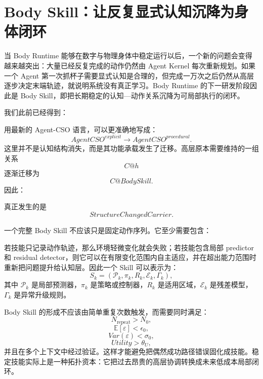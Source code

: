 \section{Body Skill：让反复显式认知沉降为身体闭环}

当 Body Runtime 能够在数字与物理身体中稳定运行以后，一个新的问题会变得越来越突出：大量已经反复完成的动作仍然由 Agent Kernel 每次重新规划。如果一个 Agent 第一次抓杯子需要显式认知是合理的，但完成一万次之后仍然从高层逐步决定末端轨迹，就说明系统没有真正学习。Body Runtime 的下一研发阶段因此是 Body Skill，即把长期稳定的认知—动作关系沉降为可局部执行的闭环。

我们此前已经得到：
\begin{statementbox}
\centering
{}
\end{statementbox}
用最新的 Agent-CSO 语言，可以更准确地写成：
\[
AgentCSO^{explicit}
\rightarrow
AgentCSO^{procedural}.
\]
这里并不是认知结构消失，而是其功能承载发生了迁移。高层原本需要维持的一组关系
\[
C@h
\]
逐渐迁移为
\[
C@BodySkill.
\]
因此：
\begin{statementbox}
\centering
{}
\end{statementbox}
真正发生的是
\[
StructureChangedCarrier.
\]

一个完整 Body Skill 不应该只是固定动作序列。它至少需要包含：
\begin{statementbox}
\centering
{}
\end{statementbox}
若技能只记录动作轨迹，那么环境轻微变化就会失败；若技能包含局部 predictor 和 residual detector，则它可以在有限变化范围内自主适应，并在超出能力范围时重新把问题提升给认知层。因此一个 Skill 可以表示为：
\[
S_k=
\left(
\mathcal P_k,
\pi_k,
R_k,
\mathcal E_k,
\Gamma_k
\right),
\]
其中 $\mathcal P_k$ 是局部预测器，$\pi_k$ 是策略或控制器，$R_k$ 是适用区域，$\mathcal E_k$ 是残差模型，$\Gamma_k$ 是异常升级规则。

Body Skill 的形成不应该由简单重复次数触发，而需要同时满足：
\[
N_{\mathrm{repeat}}>N_0,
\]
\[
\mathbb E[\varepsilon]<\epsilon_0,
\]
\[
Var(\varepsilon)<\sigma_0,
\]
\[
Utility>\theta_U,
\]
并且在多个上下文中经过验证。这样才能避免把偶然成功路径错误固化成技能。稳定技能实际上是一种拓扑资本：它把过去昂贵的高层协调转换成未来低成本局部闭环。

